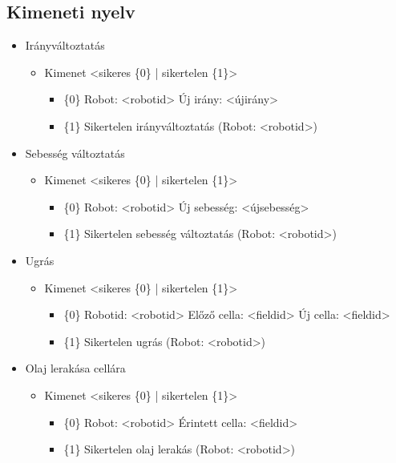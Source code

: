 \subsection{Kimeneti nyelv}

\begin{itemize}
	\item Irányváltoztatás
	\begin{itemize}
		\item Kimenet <sikeres \{0\} | sikertelen \{1\}>
		\begin{itemize}
				\item \{0\} Robot: <robotid> Új irány: <újirány>
				\item \{1\} Sikertelen irányváltoztatás (Robot: <robotid>)
		\end{itemize}
	\end{itemize}
	
	\item Sebesség változtatás
	\begin{itemize}
		\item Kimenet <sikeres \{0\} | sikertelen \{1\}>
		\begin{itemize}
			\item \{0\} Robot: <robotid> Új sebesség: <újsebesség>
			\item \{1\} Sikertelen sebesség változtatás (Robot: <robotid>)
		\end{itemize}
	\end{itemize}
	
	\item Ugrás
	\begin{itemize}
		\item Kimenet <sikeres \{0\} | sikertelen \{1\}>
		\begin{itemize}
			\item \{0\} Robotid: <robotid> Előző cella: <fieldid> Új cella: <fieldid>
			\item \{1\} Sikertelen ugrás (Robot: <robotid>)
		\end{itemize}
	\end{itemize}
	
	\item Olaj lerakása cellára
	\begin{itemize}
		\item Kimenet <sikeres \{0\} | sikertelen \{1\}>
		\begin{itemize}
			\item \{0\} Robot: <robotid>  Érintett cella: <fieldid>
			\item \{1\} Sikertelen olaj lerakás (Robot: <robotid>)
		\end{itemize}
	\end{itemize}
	

\end{itemize}
